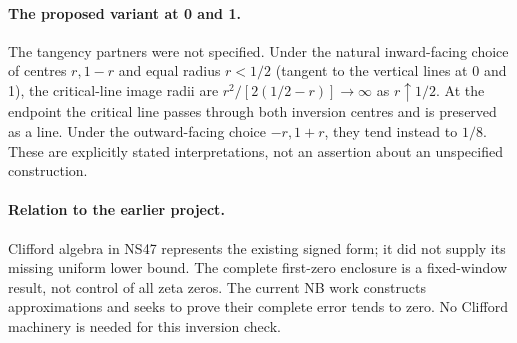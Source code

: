 \paragraph{The proposed variant at 0 and 1.}
The tangency partners were not specified. Under the natural inward-facing
choice of centres $r,1-r$ and equal radius $r<1/2$ (tangent to the vertical
lines at 0 and 1), the critical-line image radii are
$r^2/[2(1/2-r)]\to\infty$ as $r\uparrow1/2$. At the endpoint the
critical line passes through both inversion centres and is preserved as a
line. Under the outward-facing choice $-r,1+r$, they tend instead to
$1/8$. These are explicitly stated interpretations, not an assertion about
an unspecified construction.

\paragraph{Relation to the earlier project.}
Clifford algebra in NS47 represents the existing signed form; it did not
supply its missing uniform lower bound. The complete first-zero enclosure
is a fixed-window result, not control of all zeta zeros. The current NB
work constructs approximations and seeks to prove their complete error
tends to zero. No Clifford machinery is needed for this inversion check.
